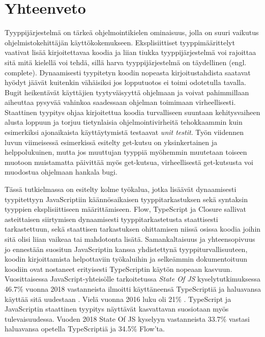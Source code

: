 \chapter{Yhteenveto}

Tyyppijärjestelmä on tärkeä ohjelmointikielen ominaisuus, jolla on suuri
vaikutus ohjelmistokehittäjän käyttökokemukseen.
Eksplisiittiset tyyppimäärittelyt vaativat lisää kirjoitettavaa koodia
ja liian tiukka tyyppijärjestelmä voi rajoittaa sitä mitä kielellä voi tehdä, sillä harva
tyyppijärjestelmä on täydellinen (engl. complete). 
Dynaamisesti tyypitetyn koodin nopeasta kirjoitustahdista saatavat hyödyt jäävät kuitenkin
vähäisiksi jos lopputuotos ei toimi odotetulla tavalla. Bugit heikentävät
käyttäjien tyytyväisyyttä ohjelmaan ja voivat pahimmillaan aiheuttaa
pysyvää vahinkoa saadessaan ohjelman toimimaan virheellisesti.
Staattinen tyypitys ohjaa kirjoitettua koodia turvalliseen suuntaan kehitysvaiheen alusta
loppuun ja torjuu tietynlaisia ohjelmointivirheitä tehokkaammin kuin
esimerkiksi ajonaikaista käyttäytymistä testaavat \textit{unit testit}.
Työn viidennen luvun viimeisessä esimerkissä esitelty get-kutsu on yksinkertainen
ja helppolukuinen, mutta jos muuttujan  tyyppiä myöhemmin
muutetaan toiseen muotoon muistamatta päivittää myös get-kutsua, virheellisestä
get-kutsusta voi muodostua ohjelmaan hankala bugi.

Tässä tutkielmassa on esitelty kolme työkalua, jotka lisäävät dynaamisesti
tyypitettyyn JavaScriptiin käännösaikaisen tyyppitarkastuksen sekä syntaksin
tyyppien eksplisiittiseen määrittämiseen. Flow, TypeScript ja Closure
sallivat asteittaisen siirtymisen dynaamisesti tyyppitarkastetusta staattisesti
tarkastettuun, sekä staattisen tarkastuksen ohittamisen niissä osissa koodia
joihin sitä olisi liian vaikeaa tai mahdotonta lisätä.
Samankaltaisuus ja yhteensopivuus jo ennestään suositun JavaScriptin kanssa
yhdistettynä tyyppiturvallisuuteen, koodin kirjoittamista helpottaviin
työkaluihin ja selkeämmin dokumentoituun koodiin ovat nostaneet erityisesti
TypeScriptin käytön nopeaan kasvuun. Vuosittaisessa JavaScript-yhteisölle
tarkoitetussa \textit{State Of JS} kyselytutkimuksessa 46.7\% vuonna 2018
vastanneista ilmoitti käyttäneensä TypeScriptiä ja haluavansa
käyttää sitä uudestaan \cite{StateOfJs2018}.
Vielä vuonna 2016 luku oli 21\% \cite{StateOfJs2016}. TypeScript ja
JavaScriptin staattinen tyypitys näyttävät kasvattavan suosiotaan myös
tulevaisuudessa. Vuoden 2018 State Of JS kyselyyn vastanneista 33.7\%
vastasi haluavansa\newline
opetella TypeScriptiä ja 34.5\% Flow'ta.
